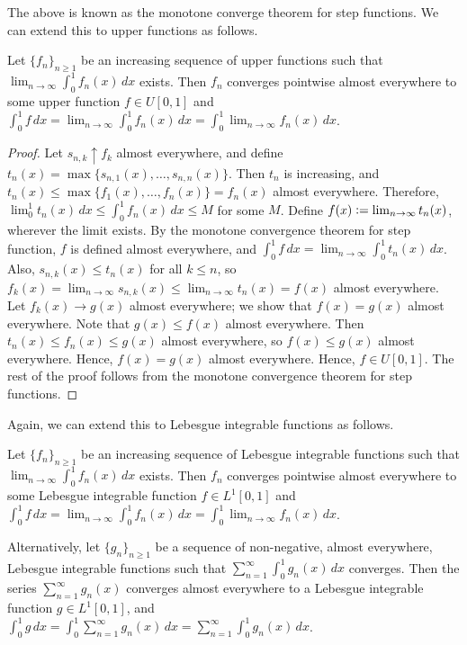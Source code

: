 The above is known as the monotone converge theorem for step functions. We can extend this to upper functions as follows.

\begin{theorem}
    Let $\{f_{n}\}_{n \geq 1}$ be an increasing sequence of upper functions such that $\lim_{n \to \infty} \int_{0}^{1} f_{n}(x) \, dx$ exists. Then $f_{n}$ converges pointwise almost everywhere to some upper function $f \in U[0,1]$ and $\int_{0}^{1} f \, dx = \lim_{n \to \infty} \int_{0}^{1} f_{n}(x) \, dx = \int_{0}^{1} \lim_{n \to \infty} f_{n}(x) \, dx$.
\end{theorem}
\begin{proof}
    Let $s_{n,k} \uparrow f_{k}$ almost everywhere, and define $t_{n}(x) = \max\{s_{n,1}(x),\ldots,s_{n,n}(x)\}$. Then $t_{n}$ is increasing, and $t_{n}(x) \leq \max\{f_{1}(x),\ldots,f_{n}(x)\} = f_{n}(x)$ almost everywhere. Therefore, $\lim_{0}^{1} t_{n}(x) \, dx \leq \int_{0}^{1} f_{n}(x) \, dx \leq M$ for some $M$. Define $f(x) \vcentcolon= \lim_{n \to \infty} t_{n}(x)$, wherever the limit exists. By the monotone convergence theorem for step function, $f$ is defined almost everywhere, and $\int_{0}^{1} f \, dx = \lim_{n \to \infty} \int_{0}^{1} t_{n}(x) \, dx$. Also, $s_{n,k}(x) \leq t_{n}(x)$ for all $k \leq n$, so $f_{k}(x) = \lim_{n \to \infty} s_{n,k}(x) \leq \lim_{n \to \infty} t_{n}(x) = f(x)$ almost everywhere. Let $f_{k}(x) \to g(x)$ almost everywhere; we show that $f(x)=g(x)$ almost everywhere. Note that $g(x) \leq f(x)$ almost everywhere. Then $t_{n}(x) \leq f_{n}(x) \leq g(x)$ almost everywhere, so $f(x) \leq g(x)$ almost everywhere. Hence, $f(x) = g(x)$ almost everywhere. Hence, $f \in U[0,1]$. The rest of the proof follows from the monotone convergence theorem for step functions.
\end{proof}

Again, we can extend this to Lebesgue integrable functions as follows.

\begin{theorem}
    Let $\{f_{n}\}_{n \geq 1}$ be an increasing sequence of Lebesgue integrable functions such that $\lim_{n \to \infty} \int_{0}^{1} f_{n}(x) \, dx$ exists. Then $f_{n}$ converges pointwise almost everywhere to some Lebesgue integrable function $f \in L^{1}[0,1]$ and $\int_{0}^{1} f \, dx = \lim_{n \to \infty} \int_{0}^{1} f_{n}(x) \, dx = \int_{0}^{1} \lim_{n \to \infty} f_{n}(x) \, dx$.

    Alternatively, let $\{g_{n}\}_{n \geq 1}$ be a sequence of non-negative, almost everywhere, Lebesgue integrable functions such that $\sum_{n=1}^{\infty} \int_{0}^{1} g_{n}(x) \, dx$ converges. Then the series $\sum_{n=1}^{\infty} g_{n}(x)$ converges almost everywhere to a Lebesgue integrable function $g \in L^{1}[0,1]$, and $\int_{0}^{1} g \, dx = \int_{0}^{1} \sum_{n=1}^{\infty} g_{n}(x) \, dx = \sum_{n=1}^{\infty} \int_{0}^{1} g_{n}(x) \, dx$.
\end{theorem}

